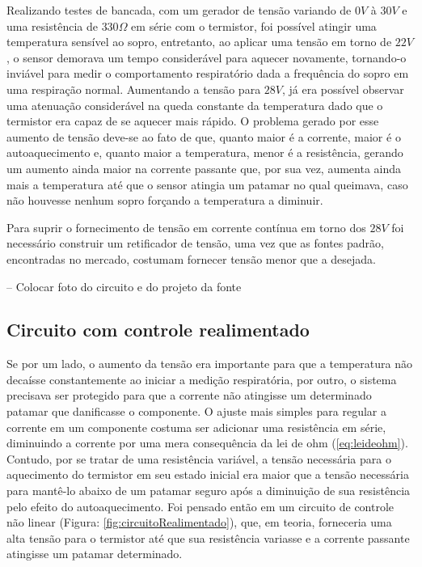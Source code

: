 Realizando testes de bancada, com um gerador de tensão variando de $0V$ à $30V$ e uma resistência de $330\Omega$ em série com o termistor, foi possível atingir uma temperatura sensível ao sopro, entretanto, ao aplicar uma tensão em torno de $22V$, o sensor demorava um tempo considerável para aquecer novamente, tornando-o inviável para medir o comportamento respiratório dada a frequência do sopro em uma respiração normal. Aumentando a tensão para $28V$, já era possível observar uma atenuação considerável na queda constante da temperatura dado que o termistor era capaz de se aquecer mais rápido. O problema gerado por esse aumento de tensão deve-se ao fato de que, quanto maior é a corrente, maior é o autoaquecimento e, quanto maior a temperatura, menor é a resistência, gerando um aumento ainda maior na corrente passante que, por sua vez, aumenta ainda mais a temperatura até que o sensor atingia um patamar no qual queimava, caso não houvesse nenhum sopro forçando a temperatura a diminuir. 
 
Para suprir o fornecimento de tensão em corrente contínua em torno dos $28V$ foi necessário construir um retificador de tensão, uma vez que as fontes padrão, encontradas no mercado, costumam fornecer tensão menor que a desejada.

-- Colocar foto do circuito e do projeto da fonte 
 
\subsection{Circuito com controle realimentado} 
 
Se por um lado, o aumento da tensão era importante para que a temperatura não decaísse constantemente ao iniciar a medição respiratória, por outro, o sistema precisava ser protegido para que a corrente não atingisse um determinado patamar que danificasse o componente. O ajuste mais simples para regular a corrente em um componente costuma ser adicionar uma resistência em série, diminuindo a corrente por uma mera consequência da lei de ohm (\ref{eq:leideohm}). Contudo, por se tratar de uma resistência variável, a tensão necessária para o aquecimento do termistor em seu estado inicial era maior que a tensão necessária para mantê-lo abaixo de um patamar seguro após a diminuição de sua resistência pelo efeito do autoaquecimento. Foi pensado então em um circuito de controle não linear (Figura: \ref{fig:circuitoRealimentado}), que, em teoria, forneceria uma alta tensão para o termistor até que sua resistência variasse e a corrente passante atingisse um patamar determinado. 
  
